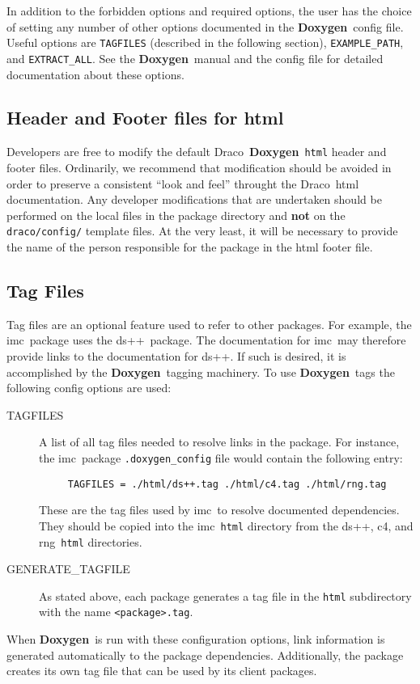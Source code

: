 \documentclass[11pt]{nmemo}
\newcommand{\draco}{{\normalfont\sffamily Draco}}
\newcommand{\doxy}{{\normalfont\bfseries Doxygen}}
\newcommand{\imc}{{\normalfont\sffamily imc}}
\newcommand{\dsxx}{{\normalfont\sffamily ds++}}
\newcommand{\cfour}{{\normalfont\sffamily c4}}
\newcommand{\rng}{{\normalfont\sffamily rng}}
\begin{document}
In addition to the forbidden options and required options, the user
has the choice of setting any number of other options documented in
the \doxy\ config file.  Useful options are \texttt{TAGFILES}
(described in the following section), \texttt{EXAMPLE\_PATH}, and
\texttt{EXTRACT\_ALL}.  See the \doxy\ manual and the config file for
detailed documentation about these options.

\subsection{Header and Footer files for html}

Developers are free to modify the default \draco\ 
\doxy\ \texttt{html} header and footer files. 
Ordinarily, we recommend that  modification should be
avoided in order to preserve a consistent ``look and feel''
throught the \draco\ html documentation.
Any developer modifications that are undertaken should be
performed on the local files in the package
directory and {\bf not} on the \texttt{draco/config/}
template files. At the very least, it will be necessary to 
provide the name of the person responsible for the package
in the html footer file.
  
\subsection{Tag Files}

Tag files are an optional feature used to refer to other packages. 
For example, the \imc\
package uses the \dsxx\ package.  The documentation for \imc\
may therefore provide links to the documentation for \dsxx.  If such is 
desired, it is  accomplished
by the \doxy\ tagging machinery.  To use \doxy\ tags the following
config options are used:
\begin{description}

\item[\ttfamily TAGFILES] A list of all tag files needed to resolve
  links in the package.  For instance, the \imc\ package
  \texttt{.doxygen\_config} file would contain the following entry:
\begin{verbatim}
     TAGFILES = ./html/ds++.tag ./html/c4.tag ./html/rng.tag
\end{verbatim}
  These are the tag files used by \imc\ to resolve documented
  dependencies. They should be copied into the \imc\ \texttt{html}
  directory from the \dsxx, \cfour,
  and \rng\ \texttt{html} directories.

\item[\ttfamily GENERATE\_TAGFILE] As stated above, each package
  generates a tag file in the \texttt{html} subdirectory with the name 
  \texttt{<package>.tag}.

\end{description}
When \doxy\ is run with these configuration options, link information
is generated automatically to the package dependencies.  Additionally, 
the package creates its own tag file that can be used by its client
packages.
\end{document}
